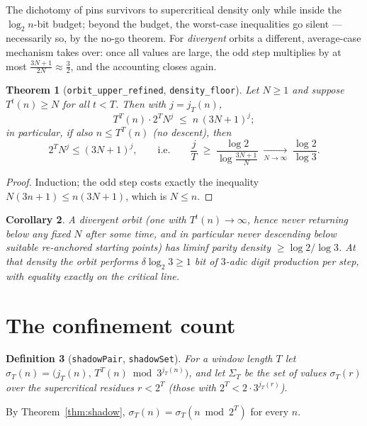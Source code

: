 \documentclass[11pt]{article}
\newtheorem{theorem}{Theorem}[section]
\newtheorem{corollary}[theorem]{Corollary}
\newtheorem{definition}[theorem]{Definition}
\newcommand{\code}[1]{\texttt{#1}}
\newcommand{\jodd}[2]{j_{#1}(#2)}
\begin{document}
The dichotomy of \cite{companion} pins survivors to supercritical
density only while inside the $\log_2 n$-bit budget; beyond the
budget, the worst-case inequalities go silent --- necessarily so, by
the no-go theorem. For \emph{divergent} orbits a different,
average-case mechanism takes over: once all values are large, the odd
step multiplies by at most $\frac{3N+1}{2N} \approx \frac32$, and the
accounting closes again.

\begin{theorem}[\code{orbit\_upper\_refined}, \code{density\_floor}]
\label{thm:floor}
Let $N \ge 1$ and suppose $T^t(n) \ge N$ for all $t < T$. Then with
$j = \jodd{T}{n}$,
\[
T^T(n) \cdot 2^T N^{j} \;\le\; n\,(3N+1)^{j};
\]
in particular, if also $n \le T^T(n)$ (no descent), then
\[
2^T N^{j} \le (3N+1)^{j},
\qquad\text{i.e.}\qquad
\frac{j}{T} \;\ge\; \frac{\log 2}{\log\frac{3N+1}{N}}
\;\xrightarrow[N \to \infty]{}\; \frac{\log 2}{\log 3}.
\]
\end{theorem}

\begin{proof}
Induction; the odd step costs exactly the inequality
$N(3n+1) \le n(3N+1)$, which is $N \le n$.
\end{proof}

\begin{corollary}\label{cor:liminf}
A divergent orbit (one with $T^t(n) \to \infty$, hence never returning
below any fixed $N$ after some time, and in particular never descending
below suitable re-anchored starting points) has liminf parity density
$\ge \log 2/\log 3$. At that density the orbit performs
$\delta \log_2 3 \ge 1$ \emph{bit of $3$-adic digit production per
step}, with equality exactly on the critical line.
\end{corollary}

\section{The confinement count}\label{sec:count}

\begin{definition}[\code{shadowPair}, \code{shadowSet}]
For a window length $T$ let
$\sigma_T(n) = \bigl(\jodd{T}{n},\, T^T(n) \bmod 3^{\jodd{T}{n}}\bigr)$,
and let $\Sigma_T$ be the set of values $\sigma_T(r)$ over the
supercritical residues $r < 2^T$ (those with
$2^T < 2\cdot 3^{\jodd{T}{r}}$).
\end{definition}

By Theorem~\ref{thm:shadow}, $\sigma_T(n) = \sigma_T(n \bmod 2^T)$ for
every $n$.
\end{document}
